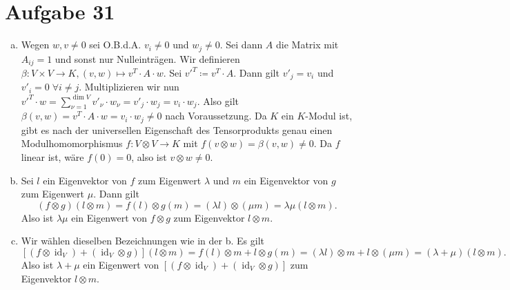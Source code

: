 \documentclass{article}
\theoremstyle{definition}
\newcommand{\id}{\operatorname{id}}
\begin{document}
\section*{Aufgabe 31}
\begin{enumerate}[(a)]
    \item Wegen $w,v\neq 0$ sei O.B.d.A. $v_i \neq 0$ und $w_j\neq 0$. Sei dann $A$ die Matrix mit $A_{ij} = 1$ und sonst nur Nulleinträgen. Wir definieren $\beta \colon V\times V \to K, (v,w) \mapsto v^T \cdot A \cdot w$. Sei $v'^T \coloneqq v^T \cdot A$. Dann gilt $v'_j = v_i$ und $v'_i = 0\;\forall i\neq j$. Multiplizieren wir nun $v'^T \cdot w = \sum_{\nu = 1}^{\dim V}v'_\nu \cdot w_\nu = v'_j \cdot w_j = v_i \cdot w_j$. Also gilt $\beta(v,w) = v^T \cdot A \cdot w = v_i\cdot w_j \neq 0$ nach Voraussetzung. Da $K$ ein $K$-Modul ist, gibt es nach der universellen Eigenschaft des Tensorprodukts genau einen Modulhomomorphismus $f\colon V \otimes V \to K$ mit $f(v\otimes w) = \beta(v,w) \neq 0$. Da $f$ linear ist, wäre $f(0) = 0$, also ist $v\otimes w\neq 0$.
    \item Sei $l$ ein Eigenvektor von $f$ zum Eigenwert $\lambda$ und $m$ ein Eigenvektor von $g$ zum Eigenwert $\mu$. Dann gilt \[(f \otimes g)(l\otimes m) = f(l)\otimes g(m) = (\lambda l) \otimes (\mu m) = \lambda \mu (l\otimes m).\] Also ist $\lambda\mu$ ein Eigenwert von $f\otimes g$ zum Eigenvektor $l\otimes m$.
    \item Wir wählen dieselben Bezeichnungen wie in der b. Es gilt \[[(f\otimes \id_V) + (\id_V \otimes g)] (l\otimes m) = f(l)\otimes m + l\otimes g(m) = (\lambda l) \otimes m + l\otimes(\mu m) = (\lambda + \mu) (l\otimes m).\] Also ist $\lambda + \mu$ ein Eigenwert von $[(f\otimes \id_V) + (\id_V \otimes g)]$ zum Eigenvektor $l\otimes m$.
\end{enumerate}
\end{document}
